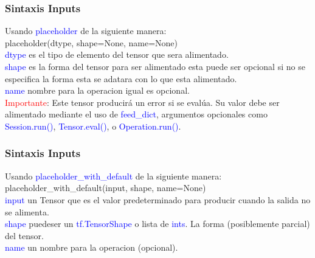\documentclass{beamer}
\begin{document}
\newpage
\begin{frame}\frametitle{Sintaxis Inputs}
Usando \textcolor{blue}{placeholder} de la siguiente manera:\\
placeholder(dtype, shape=None, name=None)\\
\vspace{2.5mm}
\textcolor{blue}{dtype} es el tipo de elemento del tensor que sera alimentado.\\
\vspace{2.5mm}
\textcolor{blue}{shape} es la forma del tensor para ser alimentado esta puede ser
opcional si no se especifica la forma esta se adatara con lo que esta alimentado.\\
\vspace{2.5mm}
\textcolor{blue}{name} nombre para la operacion igual es opcional.\\
\vspace{5mm}
\textcolor{red}{Importante}: Este tensor producirá un error si se evalúa. Su valor debe ser alimentado mediante el uso de \textcolor{blue}{feed\_dict}, argumentos opcionales como \textcolor{blue}{Session.run()}, \textcolor{blue}{Tensor.eval()}, o \textcolor{blue}{Operation.run()}.
\end{frame}

\newpage
\begin{frame}\frametitle{Sintaxis Inputs}
Usando \textcolor{blue}{placeholder\_with\_default} de la siguiente manera:\\
placeholder\_with\_default(input, shape, name=None)\\
\vspace{2.5mm}
\textcolor{blue}{input} un Tensor que es el valor predeterminado para producir cuando la salida no se alimenta.\\
\vspace{2.5mm}
\textcolor{blue}{shape} puedeser un \textcolor{blue}{tf.TensorShape} o lista de \textcolor{blue}{ints}. La forma (posiblemente parcial) del tensor.\\
\vspace{2.5mm}
\textcolor{blue}{name} un nombre para la operacion (opcional).
\end{frame}
\end{document}
